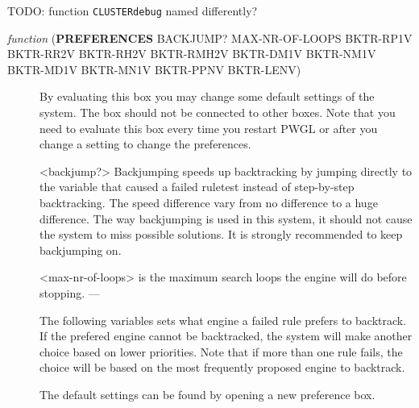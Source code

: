 TODO: function \texttt{CLUSTERdebug} named differently?

\begin{description}
\item[{ \emph{function} (\textbf{PREFERENCES} BACKJUMP? MAX-NR-OF-LOOPS BKTR-RP1V BKTR-RR2V BKTR-RH2V BKTR-RMH2V BKTR-DM1V BKTR-NM1V BKTR-MD1V BKTR-MN1V BKTR-PPNV BKTR-LENV)}] By evaluating this box you may change some default settings of the 
system. The box should not be connected to other boxes. Note that you 
need to evaluate this box every time you restart PWGL or after you 
change a setting to change the preferences.

<backjump?>     Backjumping speeds up backtracking by jumping 
directly to the variable that caused a failed ruletest instead of 
step-by-step backtracking. The speed difference vary from no 
difference to a huge difference. The way backjumping is used in this 
system, it should not cause the system to miss possible solutions. It 
is strongly recommended to keep backjumping on.

<max-nr-of-loops> is the maximum search loops the engine will do before stopping. 
---

The following variables sets what engine a failed rule prefers to
backtrack. If the prefered engine cannot be backtracked, the system
will make another choice based on lower priorities. Note that if
more than one rule fails, the choice will be based on the most
frequently proposed engine to backtrack. 

The default settings can be found by opening a new preference box.


\end{description}
